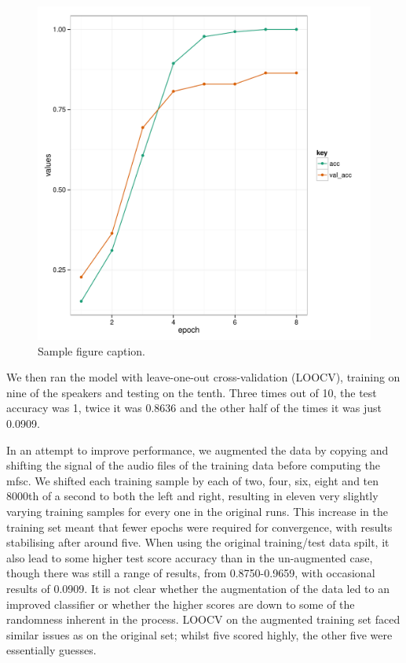 \documentclass{article} %
\begin{document}
\begin{figure}[h]
\begin{center}
\includegraphics{cnn_2d_plot_acc.pdf}
\end{center}
\caption{Sample figure caption.}
\end{figure}

We then ran the model with leave-one-out cross-validation (LOOCV), training on nine of the speakers and testing on the tenth. Three times out of 10, the test accuracy was 1, twice it was 0.8636 and the other half of the times it was just 0.0909.

In an attempt to improve performance, we augmented the data by copying and shifting the signal of the audio files of the training data before computing the mfsc. We shifted each training sample by each of two, four, six, eight and ten 8000th of a second to both the left and right, resulting in eleven very slightly varying training samples for every one in the original runs. This increase in the training set meant that fewer epochs were required for convergence, with results stabilising after around five. When using the original training/test data spilt, it also lead to some higher test score accuracy than in the un-augmented case, though there was still a range of results, from 0.8750-0.9659, with occasional results of 0.0909. It is not clear whether the augmentation of the data led to an improved classifier or whether the higher scores are down to some of the randomness inherent in the process.
LOOCV on the augmented training set faced similar issues as on the original set; whilst five scored highly, the other five were essentially guesses.
\end{document}
